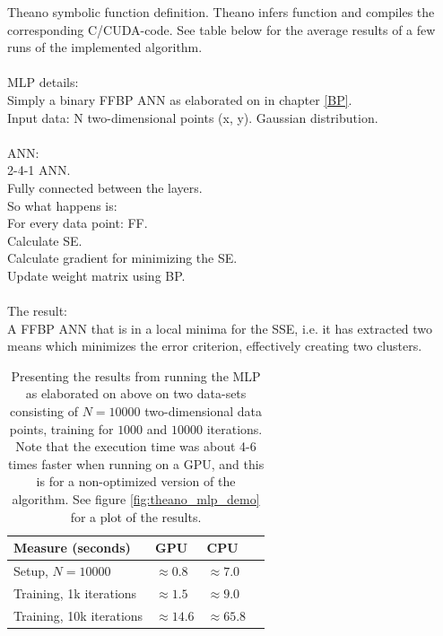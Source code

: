 Theano symbolic function definition. Theano infers function and compiles the corresponding C/CUDA-code. See table below for the average results of a few runs of the implemented algorithm.
\\\\
MLP details:
\\
Simply a binary FFBP ANN as elaborated on in chapter \ref{BP}.
\\
Input data: N two-dimensional points (x, y). Gaussian distribution.
\\\\
ANN:
\\
2-4-1 ANN.
\\
Fully connected between the layers.
\\
So what happens is: 
\\
For every data point: 
FF.
\\
Calculate SE.
\\
Calculate gradient for minimizing the SE.
\\
Update weight matrix using BP.
\\\\
The result:
\\
A FFBP ANN that is in a local minima for the SSE, i.e. it has extracted two means which minimizes the error criterion, effectively creating two clusters.


\begin{table}
\begin{center}
    \begin{tabular}{ | l | l | l | l |}
    \hline
    \textbf{Measure (seconds)} & \textbf{GPU} & \textbf{CPU} \\ \hline
     Setup, $N=10 000$ & $\approx0.8$ & $\approx7.0$ \\ \hline
     Training, 1k iterations &  $\approx1.5$ & $\approx9.0$ \\ \hline
     Training, 10k iterations &  $\approx14.6$ & $\approx65.8$ \\ \hline
    \end{tabular}
\end{center}
\caption{Presenting the results from running the MLP as elaborated on above on two data-sets consisting of $N=10 000$ two-dimensional data points, training for $1000$ and $10 000$ iterations. Note that the execution time was about 4-6 times faster when running on a GPU, and this is for a non-optimized version of the algorithm. See figure \ref{fig:theano_mlp_demo} for a plot of the results.}
\label{tab:MLP_gpu_vs_cpu}
\end{table}

